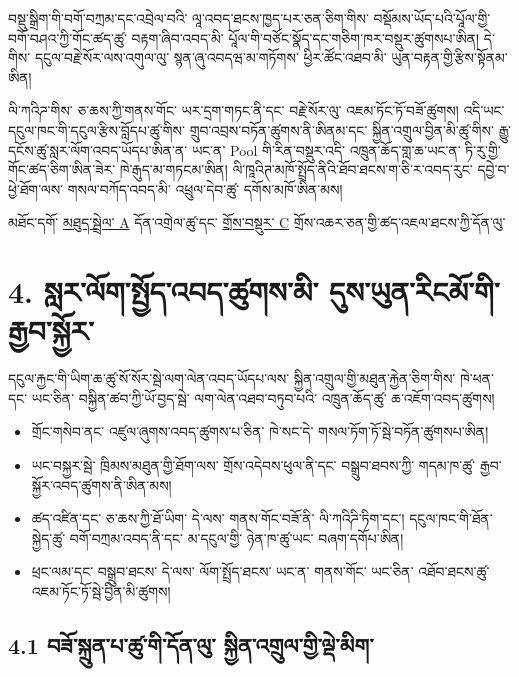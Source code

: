 \documentclass[11pt]{article}
\begin{document}
བསྡུ་སྒྲིག་གི་བགོ་བཀྲམ་དང་འབྲེལ་བའི་ ལཱ་འབད་ཐངས་ཁྱད་པར་ཅན་ཅིག་གིས་ བསྡོམས་ཡོད་པའི་པཱོལ་གྱི་བགོ་བཤའ་ཀྱི་གོང་ཚད་ཚུ་ བརྟག་ཞིབ་འབད་མི་ པཱོལ་གི་བཙོང་སྣོད་དང་གཅིག་ཁར་བསྡུར་ཚུགསཔ་ཨིན། དེ་གིས་ དངུལ་བརྗེ་སོར་ལས་འགུལ་ལུ་ སྙན་ཞུ་འབདཝ་མ་གཏོགས་ ཕྱིར་ཚོང་འཐབ་མི་ ཡུན་བརྟན་གྱི་རྩིས་སྟོནམ་ཨིན།

ལི་ཀའིཌ་གིས་ ཅ་ཆས་ཀྱི་གནས་གོང་ ཡར་དྲག་གཏང་ནི་དང་ བརྗེ་སོར་ལུ་ འཇམ་ཏོང་ཏོ་བཟོ་ཚུགས། འདི་ཡང་ དངུལ་ཁང་གི་དངུལ་རྩིས་བློདཔ་ཚུ་གིས་ གྲུབ་འབྲས་བཏོན་ཚུགས་ནི་ཨིནམ་དང་ སྐྱིན་འགྲུལ་བྱིན་མི་ཚུ་གིས་ རྒྱུ་དངོས་ཚུ་སླར་ལོག་འབད་ཡོདཔ་ཨིན་ན་ ཡང་ན་ Pool གི་རིན་བསྡུར་འདི་ འཁྲུན་ཆོད་གླ་ཆ་ཡང་ན་ ཏི་རུ་གྱི་གོང་ཚད་ཅིག་ཨིན་ཟེར་ ཁེ་རྒུད་མ་གཏངམ་ཨིན། ལི་ཁཱའིཊ་མཁོ་སྤྲོད་ནིའི་ཐོབ་ཐངས་ག་ཅི་ར་འབད་རུང་ དབྱེ་བ་ཕྱེ་ཐོག་ལས་ གསལ་བཀོད་འབད་མི་ འཕྲུལ་དེབ་ཚུ་ དགོས་མཁོ་ཨིན་མས།

མཐོང་དགོ་ \href{https://docs.cosmolocal.credit/dz/white-paper/appendix-a-math-box}{མཐུད་སྦྲེལ་ A} དོན་འགྲེལ་ཚུ་དང་ \href{https://docs.cosmolocal.credit/dz/white-paper/appendix-c-kpi-definitions}{གྲོས་བསྡུར་ C} གྲོས་འཆར་ཅན་གྱི་ཚད་འཇལ་ཐངས་ཀྱི་དོན་ལུ་


\section*{4. སླར་ལོག་སྤྱོད་འབད་ཚུགས་མི་ དུས་ཡུན་རིངམོ་གི་རྒྱབ་སྐྱོར་}

དངུལ་རྐྱང་གི་ཡིག་ཆ་ཚུ་སོ་སོར་སྦེ་ལག་ལེན་འབད་ཡོདཔ་ལས་ སྐྱིན་འགྲུལ་གྱི་མཐུན་རྐྱེན་ཅིག་གིས་ ཁེ་ཕན་དང་ ཡང་ཅིན་ བསྐྱིན་ཚབ་ཀྱི་ཡོ་བྱད་སྦེ་ ལག་ལེན་འཐབ་བཏུབ་པའི་ འཁྲུན་ཆོད་ཚུ་ ཆ་འཇོག་འབད་ཚུགས།

\begin{itemize}[leftmargin=*]
\item གྲོང་གསེབ་ནང་ འཛུལ་ཞུགས་འབད་ཚུགས་པ་ཅིན་ ཁེ་སང་དེ་ གསལ་ཏོག་ཏོ་སྦེ་བཏོན་ཚུགསཔ་ཨིན།
\item ཡང་བསྐྱར་སྦེ་ ཁྲིམས་མཐུན་གྱི་ཐོག་ལས་ གྲོས་འདེབས་ཕུལ་ནི་དང་ བསྒྲུབ་ཐབས་ཀྱི་ གདམ་ཁ་ཚུ་ རྒྱབ་སྐྱོར་འབད་ཚུགས་ནི་ཨིན་མས།
\item ཚད་འཛིན་དང་ ཅ་ཆས་ཀྱི་ཐོ་ཡིག་ དེ་ལས་ གནས་གོང་བཟོ་ནི་ ལི་ཀའིཌི་ཏིག་དང་། དངུལ་ཁང་གི་ཐོན་སྐྱེད་ཚུ་ བགོ་བཀྲམ་འབད་ནི་དང་ མ་དངུལ་གྱི་ ཉེན་ཁ་ཚུ་ཡང་ བཞག་དགོཔ་ཨིན།
\item ཕྲང་ལམ་དང་ བསྒྲུབ་ཐངས་ དེ་ལས་ ལོག་སྤྲོད་ཐངས་ ཡང་ན་ གནས་གོང་ ཡང་ཅིན་ འཐོབ་ཐངས་ཚུ་ འཇམ་ཏོང་ཏོ་སྦེ་བྱིན་མི་ཚུགས།
\end{itemize}
\subsection*{4.1 བཟོ་སྐྲུན་པ་ཚུ་གི་དོན་ལུ་ སྐྱིན་འགྲུལ་གྱི་ལྡེ་མིག་}
\end{document}
